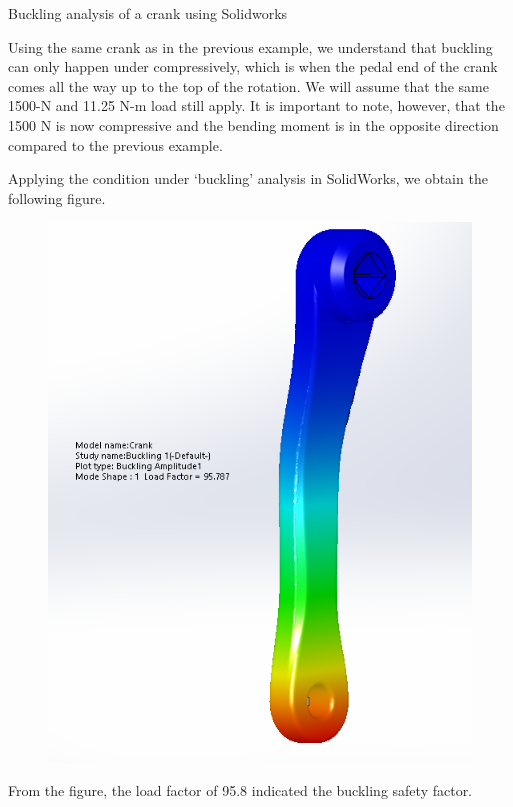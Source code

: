 \documentclass[
10pt,
a4paper,
openany,
svgnames,
]{book}
\begin{document}
\begin{example} Buckling analysis of a crank using Solidworks 

\end{example}
\begin{solution}
  Using the same crank as in the previous example, we understand that buckling can only happen under compressively, which is when the pedal end of the crank comes all the way up to the top of the rotation. We will assume that the same 1500-N and 11.25 N-m load still apply. It is important to note, however, that the 1500 N is now compressive and the bending moment is in the opposite direction compared to the previous example.

  Applying the condition under `buckling' analysis in SolidWorks, we obtain the following figure.

\begin{figure}[H]
  \centering
  \includegraphics[scale=0.5]{pictures/Intro-CAD/Crank-buckling}
\end{figure}

From the figure, the load factor of 95.8 indicated the buckling safety factor.
\end{solution}
\end{document}

